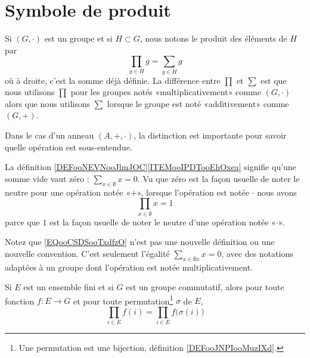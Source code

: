 \section{Symbole de produit}

\begin{normaltext}      \label{NORMooDBOFooQCwbOY}
	Si \( (G,\cdot)\) est un groupe et si \( H\subset G\), nous notons le produit des éléments de \( H\) par
	\begin{equation}
		\prod_{g\in H }g=\sum_{g\in H}g
	\end{equation}
	où à droite, c'est la somme déjà définie. La différence entre \( \prod\) et \( \sum\) est que nous utilisons \( \prod\) pour les groupes notés «multiplicativement» comme \( (G,\cdot)\) alors que nous utilisons \( \sum\) lorsque le groupe est noté «additivement» comme \( (G,+)\).

	Dans le cas d'un anneau \( (A,+,\cdot)\), la distinction est importante pour savoir quelle opération est sous-entendue.

	La définition \ref{DEFooNEVNooJlmJOC}\ref{ITEMooIPDTooEhOxea} signifie qu'une somme vide vaut zéro : \( \sum_{x\in \emptyset}x=0\). Vu que zéro est la façon usuelle de noter le neutre pour une opération notée «\( +\)», lorsque l'opération est notée \( \cdot\) nous avons
	\begin{equation}        \label{EQooCSDSooTxdfzO}
		\prod_{x\in\emptyset}x=1
	\end{equation}
	parce que \( 1\) est la façon usuelle de noter le neutre d'une opération notée «\( \cdot\)».

	Notez que \eqref{EQooCSDSooTxdfzO} n'est pas une nouvelle définition ou une nouvelle convention. C'est seulement l'égalité \( \sum_{x\in\emptyset x}x=0\), avec des notations adaptées à un groupe dont l'opération est notée multiplicativement.
\end{normaltext}

\begin{proposition}     \label{PROPooQMUDooQQVRIe}
	Si \( E\) est un ensemble fini et si \( G\) est un groupe commutatif, alors pour toute fonction \( f\colon E\to G\) et pour toute permutation\footnote{Une permutation est une bijection, définition \ref{DEFooJNPIooMuzIXd}.} \( \sigma\) de \( E\),
	\begin{equation}
		\prod_{i\in E}f(i)=\prod_{i\in E}f\big( \sigma(i) \big)
	\end{equation}
\end{proposition}

